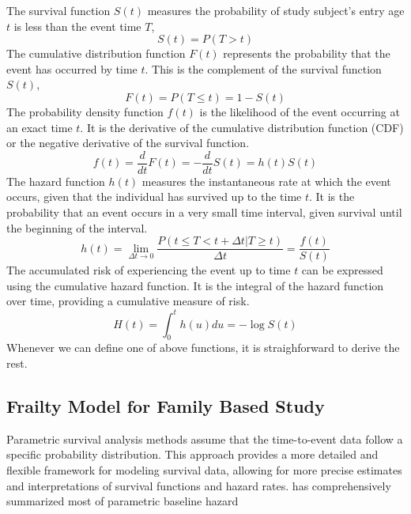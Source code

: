 The survival function $S(t)$ measures the probability of study subject's entry age $t$ is less than the event time $T$, 
\begin{equation} 
    S(t)=P(T>t)
\end{equation}
The cumulative distribution function $F(t)$ represents the probability that the event has occurred by time $t$. 
This is the complement of the survival function $S(t)$,
\begin{equation}
    F(t)=P(T\leq t)=1-S(t)
\end{equation}
The probability density function $f(t)$ is the likelihood of the event occurring at an exact time $t$. 
It is the derivative of the cumulative distribution function (CDF) or the negative derivative of the survival function. 
\begin{equation}
    f(t)=\frac{d}{dt}F(t)=-\frac{d}{dt}S(t)=h(t)S(t)
\end{equation}
The hazard function $h(t)$ measures the instantaneous rate at which the event occurs, given that the individual has survived up to the time $t$. 
It is the probability that an event occurs in a very small time interval, given survival until the beginning of the interval. 
\begin{equation}
    h(t)=\lim_{\Delta t\rightarrow 0}\frac{P(t\leq T<t+\Delta t|T\geq t)}{\Delta t}=\frac{f(t)}{S(t)}
\end{equation}
The accumulated risk of experiencing the event up to time $t$ can be expressed using the cumulative hazard function. 
It is the integral of the hazard function over time, providing a cumulative measure of risk. 
\begin{equation}
    H(t)=\int_0^t h(u)du=-\log S(t)
\end{equation}
Whenever we can define one of above functions, it is straighforward to derive the rest. 




\subsection{Frailty Model for Family Based Study}
Parametric survival analysis methods assume that the time-to-event data follow a specific probability distribution.
This approach provides a more detailed and flexible framework for modeling survival data, allowing for more precise estimates and interpretations of survival functions and hazard rates.
\citet{hosmer2008applied} has comprehensively summarized most of parametric baseline hazard